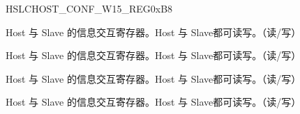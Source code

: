 \documentclass[sdio_slave.tex]{subfiles}
\begin{document}
\begin{register}{H}{SLCHOST\_CONF\_W15\_REG}{0xB8}\label{regdesc:SLCHOSTCONFW15REG}
%
%
%
%
\regnewline%
\begin{regdesc}\begin{reglist}
\item [SLCHOST\_CONF63]Host 与 Slave 的信息交互寄存器。Host 与 Slave都可读写。（读/写）
\item [SLCHOST\_CONF62]Host 与 Slave 的信息交互寄存器。Host 与 Slave都可读写。（读/写）
\item [SLCHOST\_CONF61]Host 与 Slave 的信息交互寄存器。Host 与 Slave都可读写。（读/写）
\item [SLCHOST\_CONF60]Host 与 Slave 的信息交互寄存器。Host 与 Slave都可读写。（读/写）
\end{reglist}\end{regdesc}
\end{register}
\end{document}
